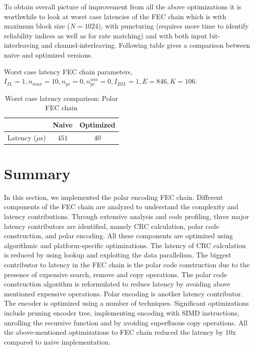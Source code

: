 
To obtain overall picture of improvement from all the above optimizations it is worthwhile to look at worst case latencies of the FEC chain which is with maximum block size ($N = 1024$), with puncturing (requires more time to identify reliability indices as well as for rate matching) and with both input bit-interleaving and channel-interleaving. Following table gives a comparison between naive and optimized versions.

Worst case latency FEC chain parameters, \newline
$I_{IL} = 1, n_{max} = 10, n_{pc} = 0 ,n_{pc}^{wm} = 0, I_{BIL} = 1, E = 846, K = 106$.
\begin{table}[!h]
	\begin{center}
		\caption{Worst case latency comparison: Polar FEC chain}
		\label{tab:worstFecChain}
		\begin{tabular}{c|c|c} %
			\textbf{ } & Naive & Optimized \\
			\hline
			Latency ($\mu$s) & $451$ & $40$\\
		\end{tabular}
	\end{center}
\end{table}

\section{Summary}
In this section, we implemented the polar encoding FEC chain. Different components of the FEC chain are analyzed to understand the complexity and latency contributions. Through extensive analysis and code profiling, three major latency contributors are identified, namely CRC calculation, polar code construction, and polar encoding. All these components are optimized using algorithmic and platform-specific optimizations. The latency of CRC calculation is reduced by using lookup and exploiting the data parallelism. The biggest contributor to latency in the FEC chain is the polar code construction due to the presence of expensive search, remove and copy operations. The polar code construction algorithm is reformulated to reduce latency by avoiding above mentioned expensive operations. Polar encoding is another latency contributor. The encoder is optimized using a number of techniques. Significant optimizations include pruning encoder tree, implementing encoding with SIMD instructions, unrolling the recursive function and by avoiding superfluous copy operations. All the above-mentioned optimizations to FEC chain reduced the latency by 10x compared to naive implementation.